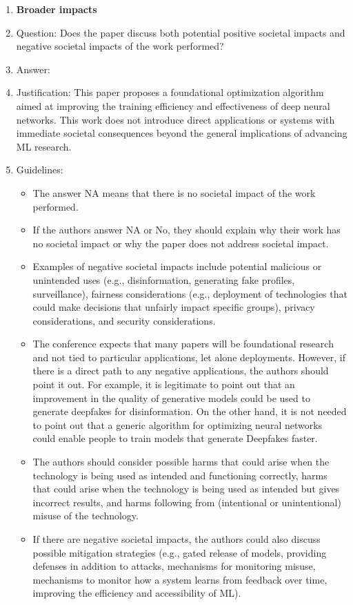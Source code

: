 \documentclass{article}
\theoremstyle{remark}
\begin{document}
\begin{enumerate}
\item {\bf Broader impacts}
    \item[] Question: Does the paper discuss both potential positive societal impacts and negative societal impacts of the work performed?
    \item[] Answer: \answerNA{} %
    \item[] Justification: This paper proposes a foundational optimization algorithm aimed at improving the training efficiency and effectiveness of deep neural networks. This work does not introduce direct applications or systems with immediate societal consequences beyond the general implications of advancing ML research.
    \item[] Guidelines:
    \begin{itemize}
        \item The answer NA means that there is no societal impact of the work performed.
        \item If the authors answer NA or No, they should explain why their work has no societal impact or why the paper does not address societal impact.
        \item Examples of negative societal impacts include potential malicious or unintended uses (e.g., disinformation, generating fake profiles, surveillance), fairness considerations (e.g., deployment of technologies that could make decisions that unfairly impact specific groups), privacy considerations, and security considerations.
        \item The conference expects that many papers will be foundational research and not tied to particular applications, let alone deployments. However, if there is a direct path to any negative applications, the authors should point it out. For example, it is legitimate to point out that an improvement in the quality of generative models could be used to generate deepfakes for disinformation. On the other hand, it is not needed to point out that a generic algorithm for optimizing neural networks could enable people to train models that generate Deepfakes faster.
        \item The authors should consider possible harms that could arise when the technology is being used as intended and functioning correctly, harms that could arise when the technology is being used as intended but gives incorrect results, and harms following from (intentional or unintentional) misuse of the technology.
        \item If there are negative societal impacts, the authors could also discuss possible mitigation strategies (e.g., gated release of models, providing defenses in addition to attacks, mechanisms for monitoring misuse, mechanisms to monitor how a system learns from feedback over time, improving the efficiency and accessibility of ML).
    \end{itemize}
    

\end{enumerate}
\end{document}
